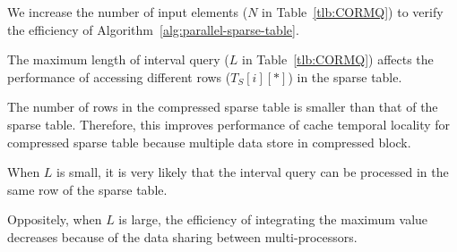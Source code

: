 
We increase the number of input elements ($N$ in Table~\ref{tlb:CORMQ})
to verify the efficiency of Algorithm~\ref{alg:parallel-sparse-table}.


The maximum length of interval query ($L$ in Table~\ref{tlb:CORMQ})
affects the performance of accessing different rows ($T_S[i][*]$) in the
sparse table.

The number of rows in the compressed sparse table is
smaller than that of the sparse table.  Therefore, this improves
performance of cache temporal locality for compressed sparse table
because multiple data store in compressed block.

When $L$ is small, it is very likely that the interval query can be
processed in the same row of the sparse table.

Oppositely, when $L$ is large, the efficiency of integrating the maximum
value decreases because of the data sharing between multi-processors.



